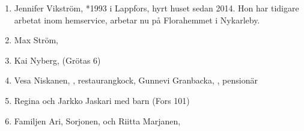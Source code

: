 \begin{enumerate}
  \item Jennifer Vikström,  *1993 i Lappfors, hyrt huset sedan 2014. Hon har tidigare arbetat inom hemservice, arbetar nu på Florahemmet i Nykarleby.
  \item Max Ström, 
  \item Kai Nyberg,  (Grötas 6)
  \item Vesa Niskanen, , restaurangkock, Gunnevi Granbacka, , pensionär
  \item Regina  och Jarkko Jaskari med barn (Fors 101)
  \item Familjen Ari, Sorjonen,  och Riitta Marjanen, 
\end{enumerate}




